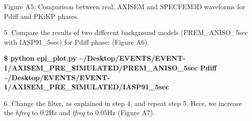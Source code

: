 \documentclass{article}
\begin{document}
\begin{center}
{\small{}Figure A5: Comparison between real, AXISEM and SPECFEM3D waveforms for 
Pdiff and PKiKP phases.}
\end{center}

\vspace{13pt}
\baselineskip=13pt
\leftskip=0pt
5. Compare the results of two different background models (PREM\_ANISO\_5sec with 
IASP91\_5sec) for Pdiff phase: (Figure A6).

\textbf{\$ python epi\_plot.py \textasciitilde{}/Desktop/EVENTS/EVENT-1/AXISEM\_PRE\_SIMULATED/PREM\_ANISO\_5sec 
Pdiff \textasciitilde{}/Desktop/EVENTS/EVENT-1/AXISEM\_PRE\_SIMULATED/IASP91\_5sec}

6. Change the filter, as explained in step 4, and repeat step 5. Here, we increase 
the \textit{hfreq} to 0.2Hz and \textit{lfreq} to 0.05Hz (Figure A7).
\end{document}

